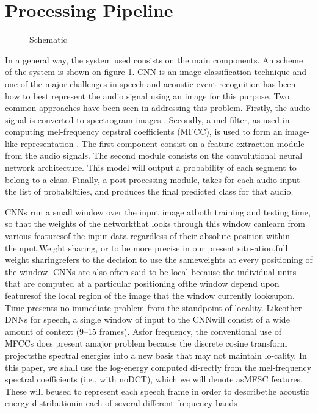 
\section{Processing Pipeline}
\label{sec:processing_architecture}
\begin{figure}
\caption{Schematic}
\label{system_scheme}
\end{figure}

In a general way, the system used consists on the main components. An scheme of the system is shown on figure \ref{system_scheme}.  CNN is an image classification technique and one of the major challenges in speech and acoustic event recognition has been how to best represent the audio signal using an image for this purpose. Two common approaches have been seen in addressing this problem. Firstly, the audio signal is converted to spectrogram images \cite{zhang2015robust}. Secondly, a mel-filter, as used in computing mel-frequency cepstral coefficients (MFCC), is used to form an image-like representation \cite{abdel2014convolutional]}.  
The first component consist on a feature extraction module  from the audio signals. The second module consists on the convolutional neural network architecture. This model will output a probability of each segment to belong to a class. Finally, a post-processing module, takes for each audio input the list of probabiltiies, and produces the final predicted class for that audio.

 



CNNs run a small window over the input image atboth training and testing time, so that the weights of the networkthat looks through this window canlearn from various featuresof the input data regardless of their absolute position within theinput.Weight sharing, or to be more precise in our present situ-ation,full weight sharingrefers to the decision to use the sameweights at every positioning of the window. CNNs are also often said to be local because the individual units that are computed at a particular positioning ofthe window depend upon featuresof the local region of the image that the window currently looksupon.
 Time presents no immediate problem from the standpoint of locality. Likeother DNNs for speech, a single window of input to the CNNwill consist of a wide amount of context (9–15 frames). Asfor frequency, the conventional use of MFCCs does present amajor problem because the discrete cosine transform projectsthe spectral energies into a new basis that may not maintain lo-cality. In this paper, we shall use the log-energy computed di-rectly from the mel-frequency spectral coefficients (i.e., with noDCT), which we will denote asMFSC features. These will beused to represent each speech frame in order to describethe acoustic energy distributionin each of several different frequency bands

